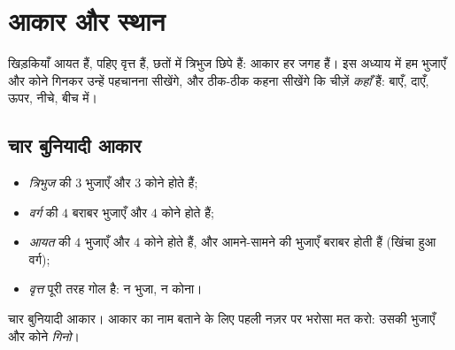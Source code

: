 \chapter{आकार और स्थान}\label{ch:g1:shapes}

खिड़कियाँ आयत हैं, पहिए वृत्त हैं, छतों में त्रिभुज छिपे हैं:
आकार हर जगह हैं। इस अध्याय में हम भुजाएँ और कोने गिनकर उन्हें
पहचानना सीखेंगे, और ठीक-ठीक कहना सीखेंगे कि चीज़ें \emph{कहाँ}
हैं: बाएँ, दाएँ, ऊपर, नीचे, बीच में।

\section{चार बुनियादी आकार}

\begin{definition}[वर्ग, आयत, त्रिभुज, वृत्त]\label{def:g1:shapes:def}
\begin{itemize}
  \item \emph{त्रिभुज} की $3$ भुजाएँ और $3$ कोने होते हैं;
  \item \emph{वर्ग} की $4$ बराबर भुजाएँ और $4$ कोने होते हैं;
  \item \emph{आयत} की $4$ भुजाएँ और $4$ कोने होते हैं, और
        आमने-सामने की भुजाएँ बराबर होती हैं (खिंचा हुआ वर्ग);
  \item \emph{वृत्त} पूरी तरह गोल है: न भुजा, न कोना।
\end{itemize}
\end{definition}

\begin{omfigure}

{\small चार बुनियादी आकार। आकार का नाम बताने के लिए पहली नज़र पर
भरोसा मत करो: उसकी भुजाएँ और कोने \emph{गिनो}।}
\end{omfigure}

